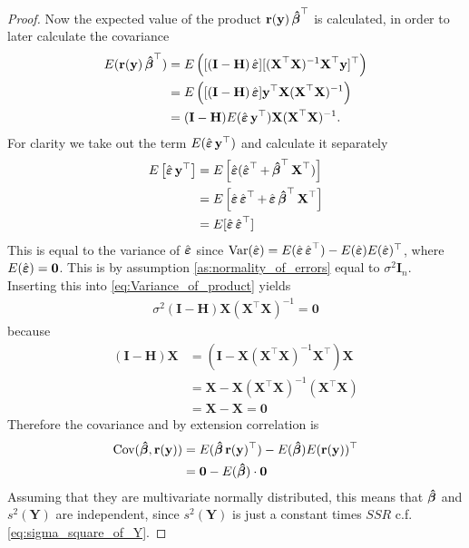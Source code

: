 \begin{proof}
Now the expected value of the product $\textbf{r}(\textbf{y}) \operatorname{\boldsymbol{\hat{\beta}}}^\top$ is calculated, in order to later calculate the covariance
\begin{align} \label{eq:Variance_of_product}
    E(\textbf{r}(\textbf{y}) \operatorname{\boldsymbol{\hat{\beta}}}^\top) &= E \left( [(\textbf{I} - \textbf{H}) \operatorname{\hat{\boldsymbol{\varepsilon}}}] [(\textbf{X}^\top \textbf{X})^{-1} \textbf{X}^\top \textbf{y}]^\top \right) \nonumber \\
    &= E \left( [(\textbf{I}-\textbf{H}) \operatorname{\hat{\boldsymbol{\varepsilon}}}] \textbf{y}^\top \textbf{X} (\textbf{X}^\top \textbf{X})^{-1} \right) \nonumber \\
    &= (\textbf{I}-\textbf{H}) E(\operatorname{\hat{\boldsymbol{\varepsilon}}} \textbf{y}^\top ) \textbf{X}(\textbf{X}^\top \textbf{X})^{-1}. 
\end{align}
For clarity we take out the term $E(\operatorname{\hat{\boldsymbol{\varepsilon}}} \textbf{y}^\top )$ and calculate it separately
\begin{align*}
    E \left[ \operatorname{\hat{\boldsymbol{\varepsilon}}} \textbf{y}^\top \right] &= E \left[ \operatorname{\hat{\boldsymbol{\varepsilon}}} (\operatorname{\hat{\boldsymbol{\varepsilon}}}^\top + \operatorname{\boldsymbol{\hat{\beta}}}^\top \textbf{X}^\top) \right] \\
    &= E \left[ \operatorname{\hat{\boldsymbol{\varepsilon}}} \operatorname{\hat{\boldsymbol{\varepsilon}}}^\top + \operatorname{\hat{\boldsymbol{\varepsilon}}} \operatorname{\boldsymbol{\hat{\beta}}}^\top \textbf{X}^\top \right] \\
    &= E[\operatorname{\hat{\boldsymbol{\varepsilon}}} \operatorname{\hat{\boldsymbol{\varepsilon}}}^\top]
\end{align*}
This is equal to the variance of $\operatorname{\hat{\boldsymbol{\varepsilon}}}$ since $\operatorname{\text{Var}}(\operatorname{\hat{\boldsymbol{\varepsilon}}}) = E(\operatorname{\hat{\boldsymbol{\varepsilon}}} \operatorname{\hat{\boldsymbol{\varepsilon}}}^\top) - E(\operatorname{\hat{\boldsymbol{\varepsilon}}})E(\operatorname{\hat{\boldsymbol{\varepsilon}}})^\top$, where $E(\operatorname{\hat{\boldsymbol{\varepsilon}}})=\textbf{0}$.
This is by assumption \ref{as:normality_of_errors} equal to $\sigma^2 \textbf{I}_n$.
Inserting this into \eqref{eq:Variance_of_product} yields
\begin{align*}
    \sigma^2 (\textbf{I}-\textbf{H}) \textbf{X} (\textbf{X}^\top \textbf{X})^{-1} = \textbf{0}
\end{align*}
because
\begin{align*}
    (\textbf{I}-\textbf{H})\textbf{X} &= (\textbf{I}-\textbf{X}(\textbf{X}^\top \textbf{X})^{-1}\textbf{X}^\top)\textbf{X} \\
    &= \textbf{X} - \textbf{X} (\textbf{X}^\top \textbf{X})^{-1} (\textbf{X}^\top \textbf{X}) \\
    &= \textbf{X} - \textbf{X} = \textbf{0}
\end{align*}
Therefore the covariance and by extension correlation is
\begin{align*}
    \operatorname{\text{Cov}} (\operatorname{\boldsymbol{\hat{\beta}}}, \textbf{r}(\textbf{y})) &= E(\operatorname{\boldsymbol{\hat{\beta}}}\textbf{r}(\textbf{y})^\top) - E(\operatorname{\boldsymbol{\hat{\beta}}}) E(\textbf{r}(\textbf{y}))^\top \\
    &= \textbf{0} - E(\operatorname{\boldsymbol{\hat{\beta}}}) \cdot \textbf{0}
\end{align*}
Assuming that they are multivariate normally distributed, this means that $\operatorname{\boldsymbol{\hat{\beta}}}$ and $s^2(\textbf{Y})$ are independent, since $s^2(\textbf{Y})$ is just a constant times $SSR$ c.f.$\!$ \eqref{eq:sigma_square_of_Y}.


\end{proof}
